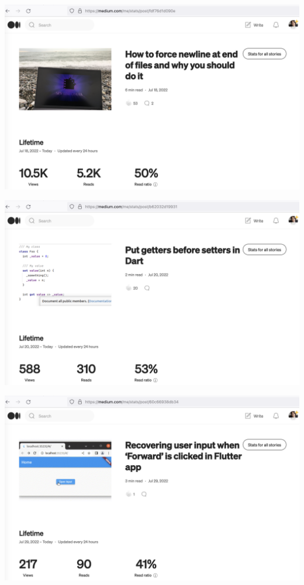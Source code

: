 \begin{center}
    \includegraphics[width=\textwidth]{2022-07-18_newline}
\end{center}

\begin{center}
    \includegraphics[width=\textwidth]{2022-07-20_getters}
\end{center}

\begin{center}
    \includegraphics[width=\textwidth]{2022-07-29_input}
\end{center}

